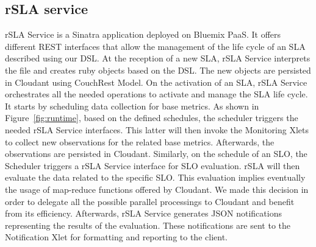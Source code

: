 


\subsection{rSLA service}
rSLA Service is a Sinatra application deployed on Bluemix PaaS. It offers different REST interfaces that allow the management of the life cycle of an SLA described using our DSL.
At the reception of a new SLA, rSLA Service interprets the file and creates ruby objects based on the DSL. The new objects are persisted in Cloudant using CouchRest Model.
On the activation of an SLA, rSLA Service orchestrates all the needed operations to activate and manage the SLA life cycle. It starts by scheduling data collection for base 
metrics. As shown in Figure~\ref{fig:runtime}, based on the defined schedules, the scheduler triggers the needed rSLA Service interfaces. This latter will then invoke the 
Monitoring Xlets to collect new observations for the related base metrics. Afterwards, the observations are persisted in Cloudant. Similarly, on the schedule of an SLO, the 
Scheduler triggers a rSLA Service interface for SLO evaluation. rSLA will then evaluate the data related to the specific SLO. This evaluation implies 
eventually the usage of map-reduce functions offered by Cloudant. We made this decision in order to delegate all the possible parallel processings to Cloudant and benefit from its 
efficiency. Afterwards, rSLA Service generates JSON notifications representing the results of the evaluation. These notifications are sent to the Notification Xlet for 
formatting and reporting to the client.   
